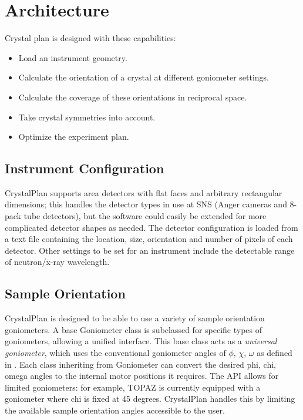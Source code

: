 \documentclass[final]{iucr}              %
\begin{document}
\section{Architecture}

Crystal plan is designed with these capabilities:

\begin{itemize}
  \item Load an instrument geometry.
  \item Calculate the orientation of a crystal at different goniometer settings.
  \item Calculate the coverage of these orientations in reciprocal space.
  \item Take crystal symmetries into account.
  \item Optimize the experiment plan.
\end{itemize}

\subsection{Instrument Configuration}

CrystalPlan supports area detectors with flat faces and arbitrary rectangular
dimensions; this handles the detector types in use at SNS (Anger cameras and
8-pack tube detectors), but the software could easily be extended for more
complicated detector shapes as needed. The detector configuration is loaded from
a text file containing the location, size, orientation and number of pixels of
each detector. Other settings to be set for an instrument include the
detectable range of neutron/x-ray wavelength.


\subsection{Sample Orientation}

CrystalPlan is designed to be able to use a variety of sample orientation
goniometers. A base Goniometer class is subclassed for specific types of
goniometers, allowing a unified interface. This base class acts as a
\emph{universal goniometer},
which uses the conventional goniometer angles of
$\phi$, $\chi$, $\omega$ as defined in \cite{busing67}.
Each class inheriting from Goniometer can convert
the desired phi, chi, omega angles to the internal motor positions it requires. The API allows
for limited goniometers: for example, TOPAZ is currently equipped with a
goniometer where chi is fixed at 45 degrees. CrystalPlan handles this by
limiting the available sample orientation angles accessible to the user.        
   
\end{document}
